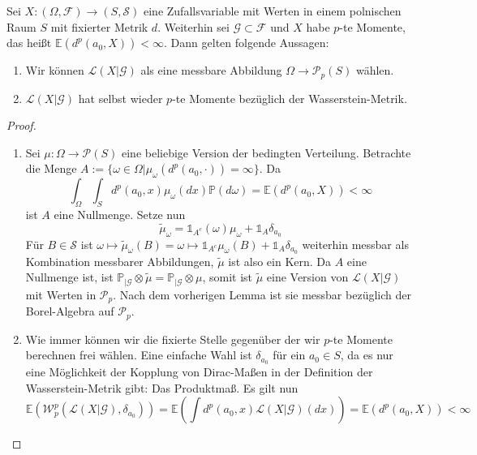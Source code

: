\begin{corollary}\label{thm:pmoments}
    Sei $X:(\Omega, \mathcal{F})\rightarrow(S, \mathcal{S})$ eine Zufallsvariable mit Werten in einem polnischen Raum $S$ mit fixierter Metrik $d$. Weiterhin sei $\mathcal{G}\subset \mathcal{F}$ und $X$ habe $p$-te Momente, das heißt $\mathbb{E}(d^p(a_0, X))<\infty$. Dann gelten folgende Aussagen:
    \begin{enumerate}
        \item Wir können $\mathcal{L}(X\vert \mathcal{G})$ als eine messbare Abbildung $\Omega\rightarrow\mathcal{P}_p(S)$ wählen.
        \item $\mathcal{L}(X\vert \mathcal{G})$ hat selbst wieder $p$-te Momente bezüglich der Wasserstein-Metrik.
    \end{enumerate}
\end{corollary}
\begin{proof}
\begin{enumerate}
    \item Sei $\mu:\Omega\rightarrow\mathcal{P}(S)$ eine beliebige Version der bedingten Verteilung. Betrachte die Menge $A:=\{\omega\in\Omega\vert \mu_\omega(d^p(a_0, \cdot)) = \infty\}$. Da 
$$\int_{\Omega}\int_{S} d^p(a_0, x)\mu_{\omega}(dx)\mathbb{P}(d\omega) = \mathbb{E}(d^p(a_0, X))<\infty$$
ist $A$ eine Nullmenge. Setze nun 
$$\tilde{\mu}_\omega=\mathds{1}_{A^c}(\omega)\mu_\omega + \mathds{1}_{A}\delta_{a_0}$$
Für $B\in\mathcal{S}$ ist $\omega\mapsto\tilde{\mu}_\omega(B) = \omega \mapsto \mathds{1}_{A^c}\mu_\omega(B)+\mathds{1}_A \delta_{a_0}$ weiterhin messbar als Kombination messbarer Abbildungen, $\tilde{\mu}$ ist also ein Kern. Da $A$ eine Nullmenge ist, ist $\mathbb{P}_{\vert \mathcal{G}}\otimes \tilde{\mu} = \mathbb{P}_{\vert\mathcal{G}} \otimes \mu$, somit ist $\tilde{\mu}$ eine Version von $\mathcal{L}(X\vert \mathcal{G})$ mit Werten in $\mathcal{P}_p$. Nach dem vorherigen Lemma ist sie messbar bezüglich der Borel-Algebra auf $\mathcal{P}_p$.
\item Wie immer können wir die fixierte Stelle gegenüber der wir $p$-te Momente berechnen frei wählen. Eine einfache Wahl ist $\delta_{a_0}$ für ein $a_0\in S$, da es nur eine Möglichkeit der Kopplung von Dirac-Maßen in der Definition der Wasserstein-Metrik gibt: Das Produktmaß. Es gilt nun
$$\mathbb{E}\left(\mathcal{W}_p^p\left(\mathcal{L}(X\vert\mathcal{G}), \delta_{a_0}\right)\right)=\mathbb{E}\left(\int d^p(a_0, x)\mathcal{L}(X\vert\mathcal{G})(dx)\right)=\mathbb{E}\left(d^p(a_0, X)\right) < \infty$$
\end{enumerate}
\end{proof}
